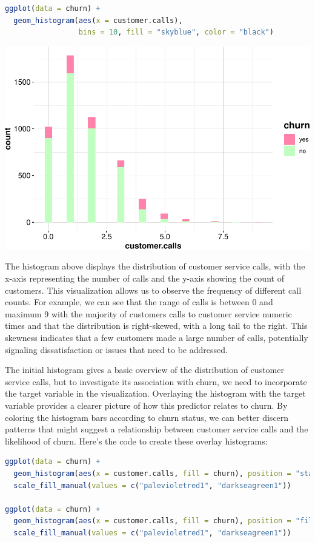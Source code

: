 \documentclass[
]{book}
\theoremstyle{definition}
\theoremstyle{definition}
\theoremstyle{definition}
\theoremstyle{definition}
\theoremstyle{remark}
\begin{document}
\begin{lstlisting}[language=R]
ggplot(data = churn) +
  geom_histogram(aes(x = customer.calls), 
                 bins = 10, fill = "skyblue", color = "black")
\end{lstlisting}

\begin{center}\includegraphics{EDA_files/figure-latex/unnamed-chunk-10-1} \end{center}

The histogram above displays the distribution of customer service calls, with the x-axis representing the number of calls and the y-axis showing the count of customers. This visualization allows us to observe the frequency of different call counts. For example, we can see that the range of calls is between 0 and maximum 9 with the majority of customers calls to customer service numeric times and that the distribution is right-skewed, with a long tail to the right. This skewness indicates that a few customers made a large number of calls, potentially signaling dissatisfaction or issues that need to be addressed.

The initial histogram gives a basic overview of the distribution of customer service calls, but to investigate its association with churn, we need to incorporate the target variable in the visualization. Overlaying the histogram with the target variable provides a clearer picture of how this predictor relates to churn. By coloring the histogram bars according to churn status, we can better discern patterns that might suggest a relationship between customer service calls and the likelihood of churn. Here's the code to create these overlay histograms:

\begin{lstlisting}[language=R]
ggplot(data = churn) +
  geom_histogram(aes(x = customer.calls, fill = churn), position = "stack") +
  scale_fill_manual(values = c("palevioletred1", "darkseagreen1")) 
  
ggplot(data = churn) +
  geom_histogram(aes(x = customer.calls, fill = churn), position = "fill") +
  scale_fill_manual(values = c("palevioletred1", "darkseagreen1")) 
\end{lstlisting}
\end{document}
